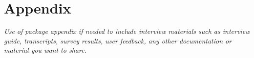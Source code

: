 \section{Appendix}
\emph{Use of package appendix if needed to include interview materials such as interview guide, transcripts, survey results, user feedback, any other documentation or material you want to share.}
